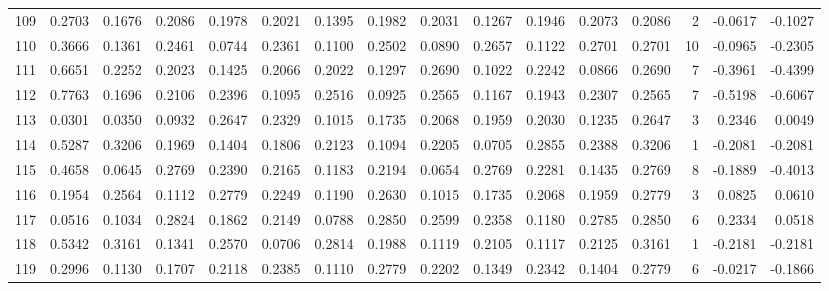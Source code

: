 \begin{tabular}{lrrrrrrrrrrrrrrr}
109 &      0.2703 &  0.1676 &  0.2086 &  0.1978 &  0.2021 &  0.1395 &  0.1982 &  0.2031 &  0.1267 &  0.1946 &   0.2073 &     0.2086 &      2 &                   -0.0617 &                    -0.1027 \\
110 &      0.3666 &  0.1361 &  0.2461 &  0.0744 &  0.2361 &  0.1100 &  0.2502 &  0.0890 &  0.2657 &  0.1122 &   0.2701 &     0.2701 &     10 &                   -0.0965 &                    -0.2305 \\
111 &      0.6651 &  0.2252 &  0.2023 &  0.1425 &  0.2066 &  0.2022 &  0.1297 &  0.2690 &  0.1022 &  0.2242 &   0.0866 &     0.2690 &      7 &                   -0.3961 &                    -0.4399 \\
112 &      0.7763 &  0.1696 &  0.2106 &  0.2396 &  0.1095 &  0.2516 &  0.0925 &  0.2565 &  0.1167 &  0.1943 &   0.2307 &     0.2565 &      7 &                   -0.5198 &                    -0.6067 \\
113 &      0.0301 &  0.0350 &  0.0932 &  0.2647 &  0.2329 &  0.1015 &  0.1735 &  0.2068 &  0.1959 &  0.2030 &   0.1235 &     0.2647 &      3 &                    0.2346 &                     0.0049 \\
114 &      0.5287 &  0.3206 &  0.1969 &  0.1404 &  0.1806 &  0.2123 &  0.1094 &  0.2205 &  0.0705 &  0.2855 &   0.2388 &     0.3206 &      1 &                   -0.2081 &                    -0.2081 \\
115 &      0.4658 &  0.0645 &  0.2769 &  0.2390 &  0.2165 &  0.1183 &  0.2194 &  0.0654 &  0.2769 &  0.2281 &   0.1435 &     0.2769 &      8 &                   -0.1889 &                    -0.4013 \\
116 &      0.1954 &  0.2564 &  0.1112 &  0.2779 &  0.2249 &  0.1190 &  0.2630 &  0.1015 &  0.1735 &  0.2068 &   0.1959 &     0.2779 &      3 &                    0.0825 &                     0.0610 \\
117 &      0.0516 &  0.1034 &  0.2824 &  0.1862 &  0.2149 &  0.0788 &  0.2850 &  0.2599 &  0.2358 &  0.1180 &   0.2785 &     0.2850 &      6 &                    0.2334 &                     0.0518 \\
118 &      0.5342 &  0.3161 &  0.1341 &  0.2570 &  0.0706 &  0.2814 &  0.1988 &  0.1119 &  0.2105 &  0.1117 &   0.2125 &     0.3161 &      1 &                   -0.2181 &                    -0.2181 \\
119 &      0.2996 &  0.1130 &  0.1707 &  0.2118 &  0.2385 &  0.1110 &  0.2779 &  0.2202 &  0.1349 &  0.2342 &   0.1404 &     0.2779 &      6 &                   -0.0217 &                    -0.1866 \\

\end{tabular}
